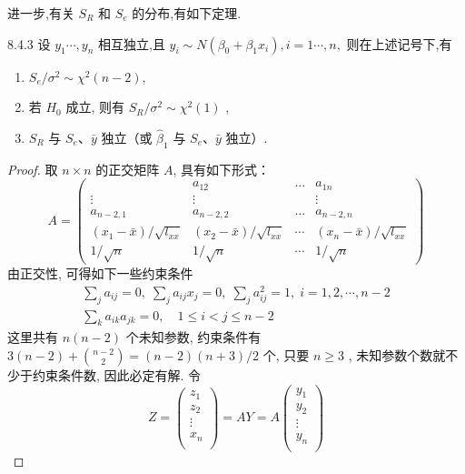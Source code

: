 进一步,有关 $S_R$ 和 $S_e$ 的分布,有如下定理.
\begin{theorem}{}{8.4.3}
设 $y_1\cdots,y_n$ 相互独立,且 $y_i\sim N(\beta_0+\beta_1x_i),i=1\cdots,n,$ 则在上述记号下,有
\begin{enumerate}
  \item  $S_e/\sigma^2 \sim \chi^2(n-2)$,
  \item  若 $H_0$ 成立, 则有 $S_R/\sigma^2 \sim \chi^{2}(1)$ ,
  \item  $S_R$ 与 $S_e$、$\bar{y}$ 独立（或 $\hat{\beta}_{1}$ 与 $S_e$、$\bar{y}$ 独立）.
\end{enumerate}
\end{theorem}
\begin{proof}
取 $n \times n$ 的正交矩阵 $A$, 具有如下形式：
\begin{equation*}
A=\begin{pmatrix} & {a_{12}} & {\dots} & {a_{1 n}} \\ {\vdots} & {\vdots} & {} & {\vdots} \\ {a_{n-2,1}} & {a_{n-2,2}} & {\dots} & {a_{n-2, n}} \\ {\left(x_{1}-\bar{x}\right) / \sqrt{l_{x x}}} & {\left(x_{2}-\bar{x}\right) / \sqrt{l_{x x}}} & {\cdots} & {\left(x_{n}-\bar{x}\right) / \sqrt{l_{x x}}} \\ {1 / \sqrt{n}} & {1 / \sqrt{n}} & {\cdots} & {1 / \sqrt{n}}
\end{pmatrix}
\end{equation*}
由正交性, 可得如下一些约束条件
\begin{gather*}
\sum_{j} a_{i j}=0,\; \sum_{j} a_{i j} x_{j}=0,\;  \sum_{j} a_{i j}^{2}=1,\;  i = 1, 2, \cdots, n-2 \\
\sum_{k} a_{i k} a_{j k}=0, \quad 1 \leqslant i<j \leqslant n-2
\end{gather*}
这里共有 $n(n-2)$ 个未知参数, 约束条件有 $ 3(n-2)+\binom{n-2}{2} = (n - 2)(n + 3)/2$ 个, 只要 $n \ge 3$ , 未知参数个数就不少于约束条件数, 因此必定有解. 令
\begin{equation*}
Z=
\begin{pmatrix}
z_1\\
z_2\\
\vdots\\
x_n\\
\end{pmatrix}
=AY = A
\begin{pmatrix}
y_1\\
y_2\\
\vdots\\
y_n\\

\end{pmatrix}
\end{equation*}
\end{proof}
